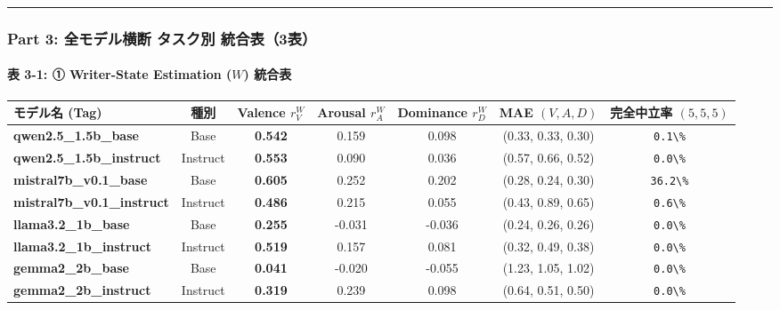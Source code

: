\vspace{0.5em}\hrule\vspace{0.5em}

\subsubsection{Part 3: 全モデル横断 タスク別 統合表（3表）}

\paragraph{表 3-1: ① Writer-State Estimation ($W$) 統合表}
\begin{center}
\small
\begin{tabular}{lcccccc}
\toprule
\textbf{モデル名 (Tag)} & \textbf{種別} & \textbf{Valence $r_V^W$} & \textbf{Arousal $r_A^W$} & \textbf{Dominance $r_D^W$} & \textbf{MAE $(V, A, D)$} & \textbf{完全中立率 $(5,5,5)$} \\
\midrule
\textbf{qwen2.5\_1.5b\_base} & Base & \textbf{0.542} & 0.159 & 0.098 & (0.33, 0.33, 0.30) & \texttt{0.1\textbackslash{}\%} \\
\textbf{qwen2.5\_1.5b\_instruct} & Instruct & \textbf{0.553} & 0.090 & 0.036 & (0.57, 0.66, 0.52) & \texttt{0.0\textbackslash{}\%} \\
\textbf{mistral7b\_v0.1\_base} & Base & \textbf{0.605} & 0.252 & 0.202 & (0.28, 0.24, 0.30) & \texttt{36.2\textbackslash{}\%} \\
\textbf{mistral7b\_v0.1\_instruct} & Instruct & \textbf{0.486} & 0.215 & 0.055 & (0.43, 0.89, 0.65) & \texttt{0.6\textbackslash{}\%} \\
\textbf{llama3.2\_1b\_base} & Base & \textbf{0.255} & -0.031 & -0.036 & (0.24, 0.26, 0.26) & \texttt{0.0\textbackslash{}\%} \\
\textbf{llama3.2\_1b\_instruct} & Instruct & \textbf{0.519} & 0.157 & 0.081 & (0.32, 0.49, 0.38) & \texttt{0.0\textbackslash{}\%} \\
\textbf{gemma2\_2b\_base} & Base & \textbf{0.041} & -0.020 & -0.055 & (1.23, 1.05, 1.02) & \texttt{0.0\textbackslash{}\%} \\
\textbf{gemma2\_2b\_instruct} & Instruct & \textbf{0.319} & 0.239 & 0.098 & (0.64, 0.51, 0.50) & \texttt{0.0\textbackslash{}\%} \\
\bottomrule
\end{tabular}
\end{center}


